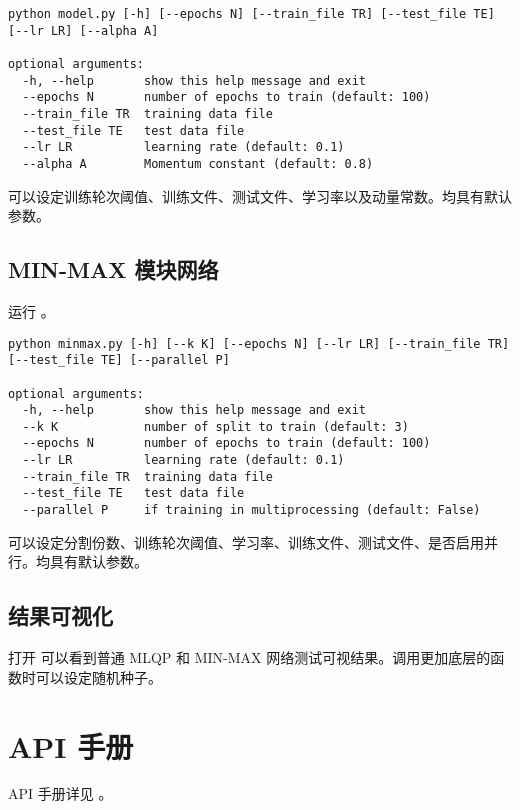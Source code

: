     \begin{lstlisting}[style=commandshell]
python model.py [-h] [--epochs N] [--train_file TR] [--test_file TE] [--lr LR] [--alpha A]

optional arguments:
  -h, --help       show this help message and exit
  --epochs N       number of epochs to train (default: 100)
  --train_file TR  training data file
  --test_file TE   test data file
  --lr LR          learning rate (default: 0.1)
  --alpha A        Momentum constant (default: 0.8)
    \end{lstlisting}

    可以设定训练轮次阈值、训练文件、测试文件、学习率以及动量常数。均具有默认参数。

    \subsection{MIN-MAX 模块网络}
    运行 。

    \begin{lstlisting}[style=commandshell]
python minmax.py [-h] [--k K] [--epochs N] [--lr LR] [--train_file TR] [--test_file TE] [--parallel P]

optional arguments:
  -h, --help       show this help message and exit
  --k K            number of split to train (default: 3)
  --epochs N       number of epochs to train (default: 100)
  --lr LR          learning rate (default: 0.1)
  --train_file TR  training data file
  --test_file TE   test data file
  --parallel P     if training in multiprocessing (default: False)
    \end{lstlisting}

    可以设定分割份数、训练轮次阈值、学习率、训练文件、测试文件、是否启用并行。均具有默认参数。

    \subsection{结果可视化}

    打开  可以看到普通 MLQP 和 MIN-MAX 网络测试可视结果。调用更加底层的函数时可以设定随机种子。

    \section{API 手册}

    API 手册详见 。
